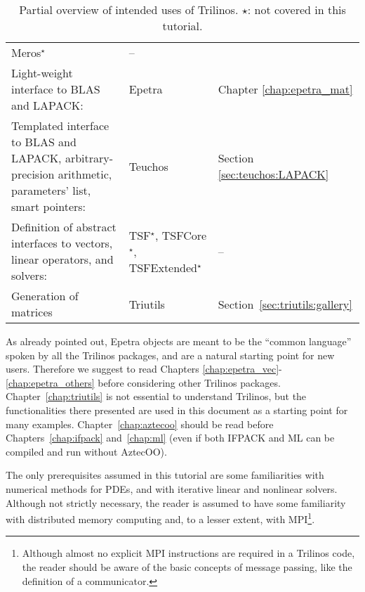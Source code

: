 \begin{table}[htbp]
\begin{tabular}{| p{8cm} | p{2.5cm} | p{3cm} |}
    Meros$^\star$ & -- \\
    Light-weight interface to BLAS and LAPACK: & Epetra 
    & Chapter \ref{chap:epetra_mat} \\
    Templated interface to BLAS and LAPACK, arbitrary-precision
    arithmetic, parameters' list, smart pointers:& Teuchos &
    Section \ref{sec:teuchos:LAPACK} \\
    Definition of abstract interfaces to vectors, linear operators, and
    solvers:& TSF$^\star$, TSFCore$^\star$, TSFExtended$^\star$   & --
    \\
    Generation of matrices & Triutils & Section~\ref{sec:triutils:gallery} \\
    \hline
  \end{tabular}
  \caption{Partial overview of intended uses of  Trilinos. $\star$:
    not covered in this tutorial.}
  \label{tab:tripackages}
\end{table}

\begin{remark}
  As already pointed out, Epetra objects are meant to be the ``common
  language'' spoken by all the Trilinos packages, and are a natural
  starting point for new users. Therefore we suggest to read Chapters
  \ref{chap:epetra_vec}-\ref{chap:epetra_others} before considering
  other Trilinos packages. Chapter~\ref{chap:triutils} is not essential
  to understand Trilinos, but the functionalities there presented are
  used in this document as a starting point for many examples.
  Chapter~\ref{chap:aztecoo} should be read before
  Chapters~\ref{chap:ifpack} and~\ref{chap:ml} (even if both IFPACK and
  ML can be compiled and run without AztecOO).
\end{remark}

The only prerequisites assumed in this tutorial are some familiarities
with numerical methods for PDEs, and with iterative linear and nonlinear
solvers. Although not strictly necessary, the reader is assumed to have
some familiarity with distributed memory computing and, to a lesser
extent, with MPI\footnote{Although almost no explicit MPI instructions
  are required in a Trilinos code, the reader should be aware of the
  basic concepts of message passing, like the definition of a
  communicator.}.

\smallskip

